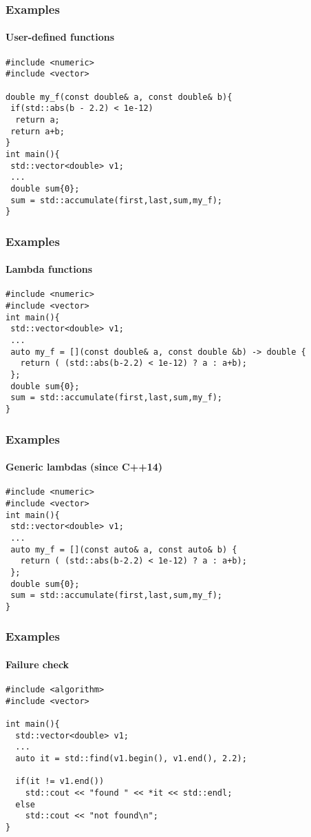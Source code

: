 \begin{frame}[fragile]
  \frametitle{Examples}
  \framesubtitle{User-defined functions}
\begin{lstlisting}
#include <numeric>
#include <vector>

double my_f(const double& a, const double& b){
 if(std::abs(b - 2.2) < 1e-12)
  return a;
 return a+b;
}
int main(){
 std::vector<double> v1;
 ...
 double sum{0};
 sum = std::accumulate(first,last,sum,my_f);
}
\end{lstlisting}

\end{frame}


\begin{frame}[fragile]
  \frametitle{Examples}
  \framesubtitle{Lambda functions}
\begin{lstlisting}
#include <numeric>
#include <vector>
int main(){
 std::vector<double> v1;
 ...
 auto my_f = [](const double& a, const double &b) -> double {
   return ( (std::abs(b-2.2) < 1e-12) ? a : a+b);
 };
 double sum{0};
 sum = std::accumulate(first,last,sum,my_f);
}
\end{lstlisting}
\end{frame}

\begin{frame}[fragile]
  \frametitle{Examples}
  \framesubtitle{Generic lambdas (since C++14)}
\begin{lstlisting}
#include <numeric>
#include <vector>
int main(){
 std::vector<double> v1;
 ...
 auto my_f = [](const auto& a, const auto& b) {
   return ( (std::abs(b-2.2) < 1e-12) ? a : a+b);
 };
 double sum{0};
 sum = std::accumulate(first,last,sum,my_f);
}
\end{lstlisting}

\end{frame}

\begin{frame}[fragile]
  \frametitle{Examples}
  \framesubtitle{Failure check}
\begin{lstlisting}
#include <algorithm>
#include <vector>
  
int main(){
  std::vector<double> v1;
  ...
  auto it = std::find(v1.begin(), v1.end(), 2.2);

  if(it != v1.end())
    std::cout << "found " << *it << std::endl;
  else
    std::cout << "not found\n";
}
  
\end{lstlisting}
\end{frame}
